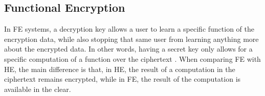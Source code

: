 \subsection{Functional Encryption}
\label{ssec:FunctionalEncryption}


In \acf{FE} systems, a decryption key allows a user to learn a specific function of the encryption data, while also stopping that same user from learning anything more about the encrypted data. In other words, having a secret key only allows for a specific computation of a function over the ciphertext \cite{boneh2011functional}. When comparing \ac{FE} with \ac{HE}, the main difference is that, in \ac{HE}, the result of a computation in the ciphertext remains encrypted, while in \ac{FE}, the result of the computation is available in the clear.




